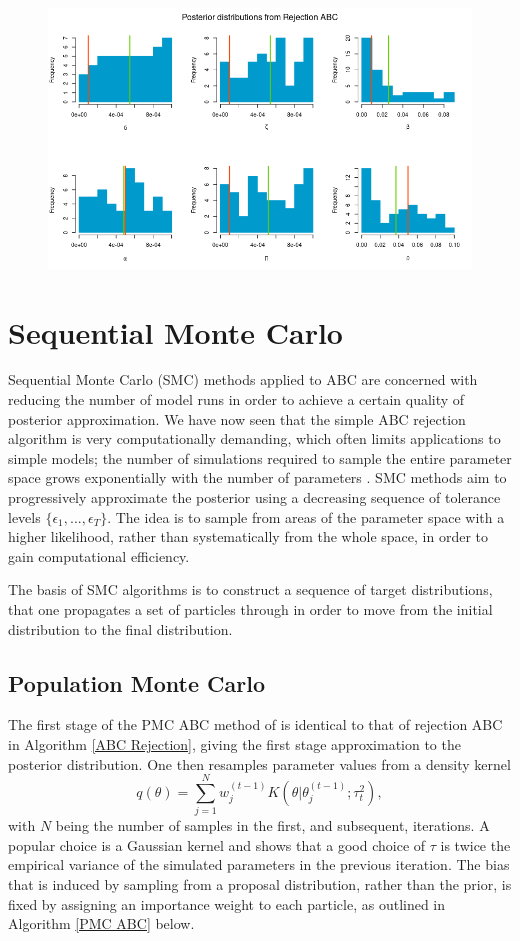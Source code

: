 \documentclass[]{article}
\begin{document}
	\begin{figure}[H]
		\centering
		\includegraphics[width=1\linewidth]{../Figures/rejection_posteriors}
	\end{figure}
	
	
	\section{Sequential Monte Carlo}
	
	Sequential Monte Carlo (SMC) methods applied to ABC are concerned with reducing the number of model runs in order to achieve a certain quality of posterior approximation. We have now seen that the simple ABC rejection algorithm is very computationally demanding, which often limits applications to simple models; the number of simulations required to sample the entire parameter space grows exponentially with the number of parameters \citep{RN32}. SMC methods aim to progressively approximate the posterior using a decreasing sequence of tolerance levels $\{\epsilon_1, ..., \epsilon_T\}$. The idea is to sample from areas of the parameter space with a higher likelihood, rather than systematically from the whole space, in order to gain computational efficiency.
	
	The basis of SMC algorithms is to construct a sequence of target distributions, that one propagates a set of particles through in order to move from the initial distribution to the final distribution. 
	
	\subsection{Population Monte Carlo}
	
	The first stage of the PMC ABC method of \cite{RN21} is identical to that of rejection ABC in Algorithm \ref{ABC Rejection}, giving the first stage approximation to the posterior distribution. One then resamples parameter values from a density kernel 
	$$ q(\theta) = \sum_{j=1}^{N} w_j^{(t-1)} K(\theta| \theta_{j}^{(t-1)};\tau_t^2),$$ 
	with $N$ being the number of samples in the first, and subsequent, iterations. A popular choice is a Gaussian kernel and \cite{RN21} shows that a good choice of $\tau$ is twice the empirical variance of the simulated parameters in the previous iteration. The bias that is induced by sampling from a proposal distribution, rather than the prior, is fixed by assigning an importance weight to each particle, as outlined in Algorithm \ref{PMC ABC} below. 
	
\end{document}

